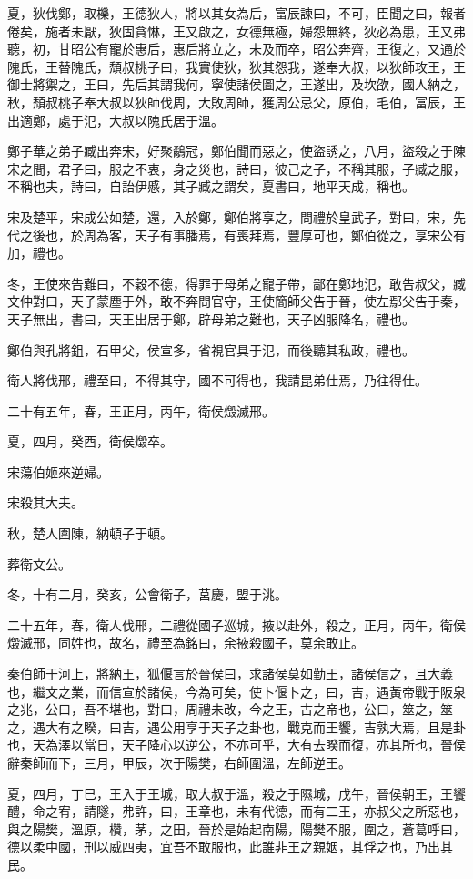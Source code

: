 \begin{pinyinscope}
夏，狄伐鄭，取櫟，王德狄人，將以其女為后，富辰諫曰，不可，臣聞之曰，報者倦矣，施者未厭，狄固貪惏，王又啟之，女德無極，婦怨無終，狄必為患，王又弗聽，初，甘昭公有寵於惠后，惠后將立之，未及而卒，昭公奔齊，王復之，又通於隗氏，王替隗氏，頹叔桃子曰，我實使狄，狄其怨我，遂奉大叔，以狄師攻王，王御士將禦之，王曰，先后其謂我何，寧使諸侯圖之，王遂出，及坎欿，國人納之，秋，頹叔桃子奉大叔以狄師伐周，大敗周師，獲周公忌父，原伯，毛伯，富辰，王出適鄭，處于氾，大叔以隗氏居于溫。

鄭子華之弟子臧出奔宋，好聚鷸冠，鄭伯聞而惡之，使盜誘之，八月，盜殺之于陳宋之間，君子曰，服之不衷，身之災也，詩曰，彼己之子，不稱其服，子臧之服，不稱也夫，詩曰，自詒伊慼，其子臧之謂矣，夏書曰，地平天成，稱也。

宋及楚平，宋成公如楚，還，入於鄭，鄭伯將享之，問禮於皇武子，對曰，宋，先代之後也，於周為客，天子有事膰焉，有喪拜焉，豐厚可也，鄭伯從之，享宋公有加，禮也。

冬，王使來告難曰，不穀不德，得罪于母弟之寵子帶，鄙在鄭地氾，敢告叔父，臧文仲對曰，天子蒙塵于外，敢不奔問官守，王使簡師父告于晉，使左鄢父告于秦，天子無出，書曰，天王出居于鄭，辟母弟之難也，天子凶服降名，禮也。

鄭伯與孔將鉏，石甲父，侯宣多，省視官具于氾，而後聽其私政，禮也。

衛人將伐邢，禮至曰，不得其守，國不可得也，我請昆弟仕焉，乃往得仕。

二十有五年，春，王正月，丙午，衛侯燬滅邢。

夏，四月，癸酉，衛侯燬卒。

宋蕩伯姬來逆婦。

宋殺其大夫。

秋，楚人圍陳，納頓子于頓。

葬衛文公。

冬，十有二月，癸亥，公會衛子，莒慶，盟于洮。

二十五年，春，衛人伐邢，二禮從國子巡城，掖以赴外，殺之，正月，丙午，衛侯燬滅邢，同姓也，故名，禮至為銘曰，余掖殺國子，莫余敢止。

秦伯師于河上，將納王，狐偃言於晉侯曰，求諸侯莫如勤王，諸侯信之，且大義也，繼文之業，而信宣於諸侯，今為可矣，使卜偃卜之，曰，吉，遇黃帝戰于阪泉之兆，公曰，吾不堪也，對曰，周禮未改，今之王，古之帝也，公曰，筮之，筮之，遇大有之睽，曰吉，遇公用享于天子之卦也，戰克而王饗，吉孰大焉，且是卦也，天為澤以當日，天子降心以逆公，不亦可乎，大有去睽而復，亦其所也，晉侯辭秦師而下，三月，甲辰，次于陽樊，右師圍溫，左師逆王。

夏，四月，丁巳，王入于王城，取大叔于溫，殺之于隰城，戊午，晉侯朝王，王饗醴，命之宥，請隧，弗許，曰，王章也，未有代德，而有二王，亦叔父之所惡也，與之陽樊，溫原，欑，茅，之田，晉於是始起南陽，陽樊不服，圍之，蒼葛呼曰，德以柔中國，刑以威四夷，宜吾不敢服也，此誰非王之親姻，其俘之也，乃出其民。


\end{pinyinscope}
